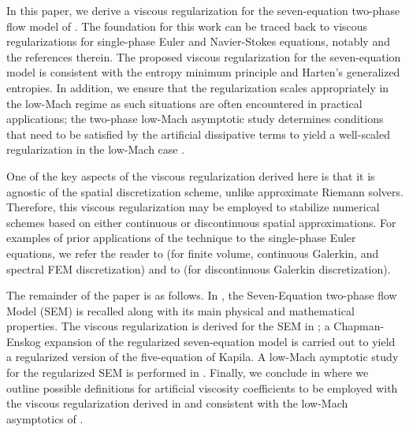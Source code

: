 \documentclass[preprint,10pt]{elsarticle}
\begin{document}
In this paper, we derive a viscous regularization for the seven-equation two-phase flow model of \cite{SEM}. The foundation for this work 
can be traced back to viscous regularizations for single-phase Euler and Navier-Stokes equations, notably \cite{jlg} and the references therein. 
The proposed viscous regularization for the seven-equation model is consistent with the entropy minimum principle and Harten's generalized 
entropies. In addition, we ensure that the regularization scales appropriately in the low-Mach regime as such situations are often encountered 
in practical applications; the two-phase low-Mach asymptotic study determines conditions that need to be satisfied by the artificial dissipative 
terms to yield a well-scaled regularization in the low-Mach case \cite{Marco_paper_low_mach}. 

One of the key aspects of the viscous regularization derived here is that it is agnostic of the spatial discretization scheme, unlike approximate 
Riemann solvers. Therefore, this viscous regularization may be employed to stabilize numerical schemes based on either continuous or discontinuous 
spatial approximations. For examples of prior applications of the technique to the single-phase Euler equations, we refer the reader to \cite{jlg} 
(for finite volume, continuous Galerkin, and spectral FEM discretization) and to \cite{valentin} (for discontinuous Galerkin discretization). 

The remainder of the paper is as follows. In , the Seven-Equation two-phase flow Model (SEM) is recalled along with its main 
physical and mathematical properties. The viscous regularization is derived for the SEM in ;  a Chapman-Enskog expansion of the 
regularized seven-equation model is carried out to yield a regularized version of the five-equation of Kapila.
A low-Mach aymptotic study for the regularized SEM is performed in . 
Finally, we conclude in  where we outline possible definitions for artificial viscosity coefficients to be employed with the 
viscous regularization derived in  and consistent with the low-Mach asymptotics of .
\end{document}
